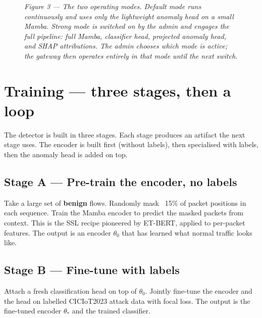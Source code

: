 \documentclass[11pt,a4paper]{article}
\begin{document}
\begin{figure}[H]
\caption*{\small\textit{Figure 3 --- The two operating modes. Default mode runs continuously and uses only the lightweight anomaly head on a small Mamba. Strong mode is switched on by the admin and engages the full pipeline: full Mamba, classifier head, projected anomaly head, and SHAP attributions. The admin chooses which mode is active; the gateway then operates entirely in that mode until the next switch.}}
\end{figure}

\section{Training --- three stages, then a loop}

The detector is built in three stages. Each stage produces an artifact the next stage uses. The encoder is built first (without labels), then specialised with labels, then the anomaly head is added on top.

\subsection{Stage A --- Pre-train the encoder, no labels}
Take a large set of \textbf{benign} flows. Randomly mask ~15\% of packet positions in each sequence. Train the Mamba encoder to predict the masked packets from context. This is the SSL recipe pioneered by ET-BERT, applied to per-packet features. The output is an encoder $\theta_0$ that has learned what normal traffic looks like.

\subsection{Stage B --- Fine-tune with labels}
Attach a fresh classification head on top of $\theta_0$. Jointly fine-tune the encoder and the head on labelled CICIoT2023 attack data with focal loss. The output is the fine-tuned encoder $\theta_*$ and the trained classifier.
\end{document}
